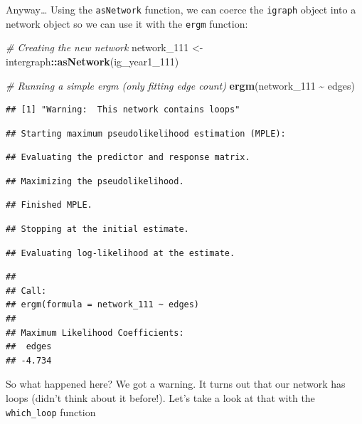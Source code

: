 \documentclass[
]{book}
\newenvironment{Shaded}{\begin{snugshade}}{\end{snugshade}}
\newcommand{\CommentTok}[1]{\textcolor[rgb]{0.56,0.35,0.01}{\textit{#1}}}
\newcommand{\FunctionTok}[1]{\textcolor[rgb]{0.13,0.29,0.53}{\textbf{#1}}}
\newcommand{\NormalTok}[1]{#1}
\newcommand{\OtherTok}[1]{\textcolor[rgb]{0.56,0.35,0.01}{#1}}
\newcommand{\SpecialCharTok}[1]{\textcolor[rgb]{0.81,0.36,0.00}{\textbf{#1}}}
\begin{document}
Anyway\ldots{} Using the \texttt{asNetwork} function, we can coerce the \texttt{igraph} object into a network object so we can use it with the \texttt{ergm} function:

\begin{Shaded}
\begin{Highlighting}[]
\CommentTok{\# Creating the new network}
\NormalTok{network\_111 }\OtherTok{\textless{}{-}}\NormalTok{ intergraph}\SpecialCharTok{::}\FunctionTok{asNetwork}\NormalTok{(ig\_year1\_111)}

\CommentTok{\# Running a simple ergm (only fitting edge count)}
\FunctionTok{ergm}\NormalTok{(network\_111 }\SpecialCharTok{\textasciitilde{}}\NormalTok{ edges)}
\end{Highlighting}
\end{Shaded}

\begin{verbatim}
## [1] "Warning:  This network contains loops"
\end{verbatim}

\begin{verbatim}
## Starting maximum pseudolikelihood estimation (MPLE):
\end{verbatim}

\begin{verbatim}
## Evaluating the predictor and response matrix.
\end{verbatim}

\begin{verbatim}
## Maximizing the pseudolikelihood.
\end{verbatim}

\begin{verbatim}
## Finished MPLE.
\end{verbatim}

\begin{verbatim}
## Stopping at the initial estimate.
\end{verbatim}

\begin{verbatim}
## Evaluating log-likelihood at the estimate.
\end{verbatim}

\begin{verbatim}
## 
## Call:
## ergm(formula = network_111 ~ edges)
## 
## Maximum Likelihood Coefficients:
##  edges  
## -4.734
\end{verbatim}

So what happened here? We got a warning. It turns out that our network has loops (didn't think about it before!). Let's take a look at that with the \texttt{which\_loop} function
\end{document}
